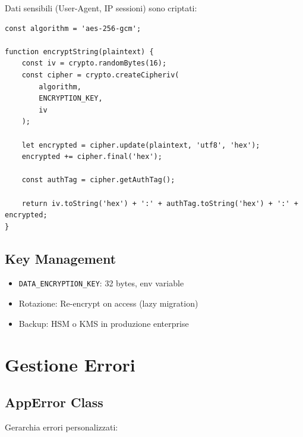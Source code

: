 \documentclass[12pt,a4paper]{report}
\begin{document}
Dati sensibili (User-Agent, IP sessioni) sono criptati:

\begin{lstlisting}[caption={Encryption Service}]
const algorithm = 'aes-256-gcm';

function encryptString(plaintext) {
    const iv = crypto.randomBytes(16);
    const cipher = crypto.createCipheriv(
        algorithm, 
        ENCRYPTION_KEY, 
        iv
    );
    
    let encrypted = cipher.update(plaintext, 'utf8', 'hex');
    encrypted += cipher.final('hex');
    
    const authTag = cipher.getAuthTag();
    
    return iv.toString('hex') + ':' + authTag.toString('hex') + ':' + encrypted;
}
\end{lstlisting}

\section{Key Management}

\begin{warnbox}
\begin{itemize}
    \item \texttt{DATA\_ENCRYPTION\_KEY}: 32 bytes, env variable
    \item Rotazione: Re-encrypt on access (lazy migration)
    \item Backup: HSM o KMS in produzione enterprise
\end{itemize}
\end{warnbox}

\chapter{Gestione Errori}

\section{AppError Class}

Gerarchia errori personalizzati:
\end{document}

